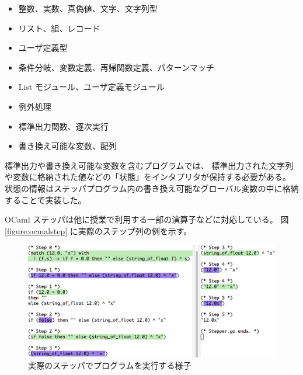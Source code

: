 \begin{itemize}
\item 整数、実数、真偽値、文字、文字列型
\item リスト、組、レコード
\item ユーザ定義型
\item 条件分岐、変数定義、再帰関数定義、パターンマッチ
\item List モジュール、ユーザ定義モジュール
\item 例外処理
\item 標準出力関数、逐次実行
\item 書き換え可能な変数、配列
\end{itemize}

標準出力や書き換え可能な変数を含むプログラムでは、
標準出力された文字列や変数に格納された値などの「状態」をインタプリタが保持する必要がある。
状態の情報はステッパプログラム内の書き換え可能なグローバル変数の中に格納することで実装した。

OCaml ステッパは他に授業で利用する一部の演算子などに対応している。
図 \ref{figure:ocmalstep} に実際のステップ列の例を示す。


\begin{figure}
  \includegraphics[width=14cm]{6/longexample.eps}
  \caption{実際のステッパでプログラムを実行する様子}
  \label{figure:ocamlstep}
\end{figure}

